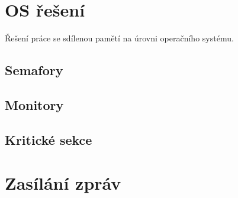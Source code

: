 \begin{compactitem}
    \item {}
\end{compactitem}


\section{OS řešení}

\begin{compactitem}
    \item Řešení práce se sdílenou pamětí na úrovni operačního systému.
\end{compactitem}

\subsection{Semafory}

\begin{compactitem}
    \item {}
\end{compactitem}

\subsection{Monitory}

\begin{compactitem}
    \item {}
\end{compactitem}

\subsection{Kritické sekce}

\begin{compactitem}
    \item {}
\end{compactitem}


\section{Zasílání zpráv}

